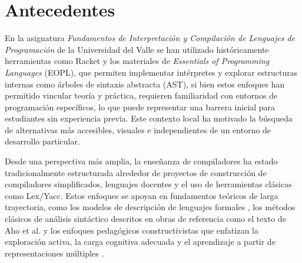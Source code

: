

\section{Antecedentes}
En la asignatura \emph{Fundamentos de Interpretación y Compilación de Lenguajes de Programación} de la Universidad del Valle se han utilizado históricamente herramientas como Racket y los materiales de \emph{Essentials of Programming Languages} (EOPL), que permiten implementar intérpretes y explorar estructuras internas como árboles de sintaxis abstracta (AST), si bien estos enfoques han permitido vincular teoría y práctica, requieren familiaridad con entornos de programación específicos, lo que puede representar una barrera inicial para estudiantes sin experiencia previa. Este contexto local ha motivado la búsqueda de alternativas más accesibles, visuales e independientes de un entorno de desarrollo particular.

Desde una perspectiva más amplia, la enseñanza de compiladores ha estado tradicionalmente estructurada alrededor de proyectos de construcción de compiladores simplificados, lenguajes docentes y el uso de herramientas clásicas como Lex/Yacc. Estos enfoques se apoyan en fundamentos teóricos de larga trayectoria, como los modelos de descripción de lenguajes formales \cite{gordon2024linguistics}, los métodos clásicos de análisis sintáctico descritos en obras de referencia como el texto de Aho et al. \cite{10.5555/1177220} y los enfoques pedagógicos constructivistas que enfatizan la exploración activa, la carga cognitiva adecuada y el aprendizaje a partir de representaciones múltiples \cite{benitez2023constructivismo,sweller2024cognitive, hernandez2022aprendizaje,betancur2023aplicacion}.

